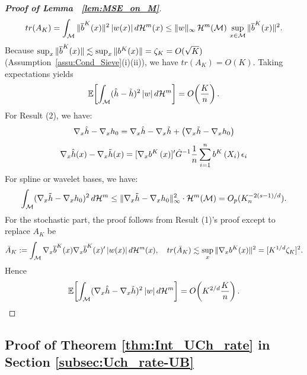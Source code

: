 \documentclass[12pt,american]{article}
\newcommand{\cH}{\mathcal{H}}
\theoremstyle{definition}
\theoremstyle{plain}
\theoremstyle{definition}
\theoremstyle{plain}
\theoremstyle{plain}
\theoremstyle{plain}
\theoremstyle{plain}
\theoremstyle{plain}
\newcommand{\E}{\mathbb{E}}
\begin{document}
\begin{proof}[\textbf{Proof of Lemma ~\ref{lem:MSE_on_M}}]
\[
tr(A_K)
=\int_\cM \|\ol b^K(x)\|^2\,|w(x)|\,d\cH^m(x)
\le \|w\|_\infty\,\cH^m(\cM)\,\sup_{x\in\cM}\|\ol b^K(x)\|^2.
\]
Because $\sup_x\|\overline{b}^K(x)\|\lesssim \sup_x\|b^K(x)\|=\zeta_K=O(\sqrt K)$
(Assumption~\ref{assu:Cond_Sieve}(i)(ii)),
we have $tr(A_K)=O(K)$. Taking expectations yields
\[
\E\!\left[\int_\cM (\hat h-\tilde h)^2\,|w|\,d\cH^m\right]
=O\!\left(\frac{K}{n}\right).
\]
For Result (2), we have:
\[
\nabla_x\hat{h}-\nabla_xh_0=\nabla_x\hat{h}-\nabla_x \tilde{h}+ \left(\nabla_x \tilde{h}-\nabla_xh_0 \right)
\]
\[
\nabla_x\hat{h}(x) -\nabla_x \tilde{h}(x)=[\nabla_xb^{K}\left(x\right)]^{\prime}\hat{G}^{-1}\frac{1}{n}\sum_{i=1}^{n} b^{K}\left(X_{i}\right)\epsilon_i
\]
For spline or wavelet bases, we have:
\[
\int_\cM (\Dif_x\tilde{h} - \Dif_xh_0)^2 \, d\cH^m \le \|\Dif_x\tilde{h} - \Dif_xh_0\|_\infty^2 \cdot \cH^m(\cM) = O_p(K_n^{-2(s-1)/d}).
\]
For the stochastic part, the proof follows from Result (1)'s proof except to replace $A_K$ be
\[
\bar{A}_K:=\int_\cM \Dif_x \ol b^K(x)\Dif_x \ol b^K(x)'\,|w(x)|\,d\cH^m(x),~~~tr(\bar{A}_K)\lesssim \sup_x\|\Dif_x b^K(x)\|^2=[ K^{1/d} \zeta_K]^2.
\]
Hence
\[
\E\!\left[\int_\cM (\Dif_x\hat h-\Dif_x\tilde h)^2\,|w|\,d\cH^m\right]
=O\!\left(K^{2/d}\frac{K}{n}\right).
\]
\end{proof}

\subsection{Proof of Theorem \ref{thm:Int_UCh_rate} in Section \ref{subsec:Uch_rate-UB}}
\end{document}
